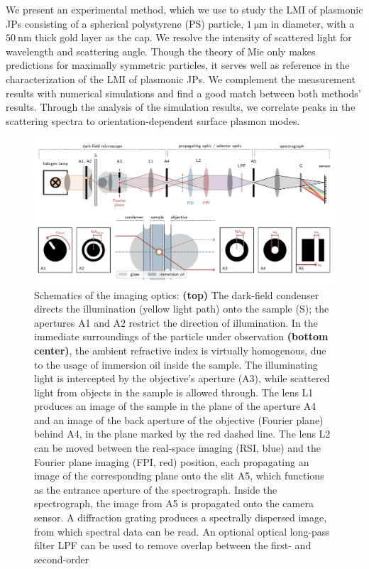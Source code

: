 \documentclass[10pt]{article}
\begin{document}
\begin{multicols}{2}
We present an experimental method, which we use to study the LMI of plasmonic JPs consisting of a spherical polystyrene (PS) particle, $\SI{1}{\micro\meter}$ in diameter, with a $\SI{50}{\nano\meter}$ thick gold layer as the cap. 
We resolve the intensity of scattered light for wavelength and scattering angle. 
Though the theory of Mie \cite{Mie1908} only makes predictions for maximally symmetric particles, it serves well as reference in the characterization of the LMI of plasmonic JPs. 
We complement the measurement results with numerical simulations and find a good match between both methods' results. 
Through the analysis of the simulation results, we correlate peaks in the scattering spectra to orientation-dependent surface plasmon modes. 




\begin{figure}[t]
    \centering
    \includegraphics[width=\textwidth]{[fig] setup}
    \caption{
    Schematics of the imaging optics: 
    {\sffamily\bfseries (top)} The dark-field condenser directs the illumination (yellow light path) onto the sample {\sffamily (S)}; the apertures {\sffamily A1} and {\sffamily A2} restrict the direction of illumination. 
    In the immediate surroundings of the particle under observation {\sffamily\bfseries (bottom center)}, the ambient refractive index is virtually homogenous, due to the usage of immersion oil inside the sample.  
    The illuminating light is intercepted by the objective's aperture {\sffamily (A3)}, while scattered light from objects in the sample is allowed through. 
    The lens {\sffamily L1} produces an image of the sample in the plane of the aperture {\sffamily A4} and an image of the back aperture of the objective (Fourier plane) behind {\sffamily A4}, in the plane marked by the red dashed line. 
    The lens {\sffamily L2} can be moved between the real-space imaging ({\sffamily RSI}, blue) and the Fourier plane imaging ({\sffamily FPI}, red) position, each propagating an image of the corresponding plane onto the slit {\sffamily A5}, which functions as the entrance aperture of the spectrograph. 
    Inside the spectrograph, the image from {\sffamily A5} is propagated onto the camera sensor. 
    A diffraction grating produces a spectrally dispersed image, from which spectral data can be read. 
    An optional optical long-pass filter {\sffamily LPF} can be used to remove overlap between the first- and second-order 
    }
    \label{fig:setup}
\end{figure}


\end{multicols}
\end{document}
